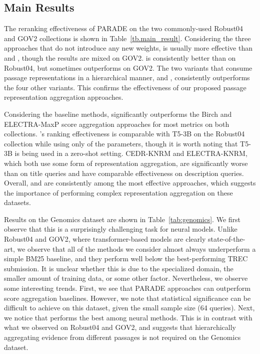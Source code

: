 \subsection{Main Results}
\label{sec:results}

The reranking effectiveness of PARADE on the two commonly-used Robust04 and GOV2 collections is shown in Table~\ref{tb.main_result}.
Considering the three approaches that do not introduce any new weights,  is usually more effective than  and , though the results are mixed on GOV2.
 is consistently better than  on Robust04, but  sometimes outperforms  on GOV2.
The two variants that consume passage representations in a hierarchical manner,  and , consistently outperforms the four other variants.
This confirms the effectiveness of our proposed passage representation aggregation approaches.

Considering the baseline methods,  significantly outperforms the Birch and ELECTRA-MaxP score aggregation approaches for most metrics on both collections.
's ranking effectiveness is comparable with T5-3B on the Robust04 collection while using only  of the parameters, though it is worth noting that T5-3B is being used in a zero-shot setting.
CEDR-KNRM and ELECTRA-KNRM, which both use some form of representation aggregation, are significantly worse than  on title queries and have comparable effectiveness on description queries.
Overall,  and  are consistently among the most effective approaches, which suggests the importance of performing complex representation aggregation on these datasets.






Results on the Genomics dataset are shown in Table~\ref{tab:genomics}. We first observe that this is a surprisingly challenging task for neural models. Unlike Robust04 and GOV2, where transformer-based models are clearly state-of-the-art, we observe that all of the methods we consider almost always underperform a simple BM25 baseline, and they perform well below the best-performing TREC submission.
It is unclear whether this is due to the specialized domain, the smaller amount of training data, or some other factor. 
Nevertheless, we observe some interesting trends.
First, we see that PARADE approaches can outperform score aggregation baselines. However, we note that statistical significance can be difficult to achieve on this dataset, given the small sample size (64 queries). Next, we notice that  performs the best among neural methods. This is in contrast with what we observed on Robust04 and GOV2, and suggests that hierarchically aggregating evidence from different passages is not required on the Genomics dataset.

